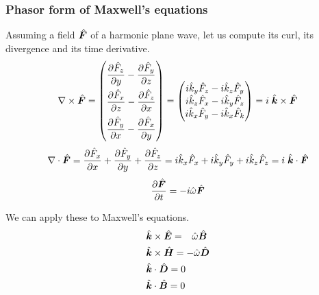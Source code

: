 \subsubsection{Phasor form of Maxwell's equations}
Assuming a field $\hat{\bm{F}}$ of a harmonic plane wave, let us compute its curl, its divergence and its time derivative.
\begin{equation}
    \setlength{\delimitershortfall}{0pt}
    \nabla \times \vectcp{F}
    =
    \begin{pmatrix}
        \dfrac{\partial \cp{F}_z}{\partial y} -
        \dfrac{\partial \cp{F}_y}{\partial z}
        \\[2ex]
        \dfrac{\partial \cp{F}_x}{\partial z} -
        \dfrac{\partial \cp{F}_z}{\partial x}
        \\[2ex]
        \dfrac{\partial \cp{F}_y}{\partial x} -
        \dfrac{\partial \cp{F}_x}{\partial y}
    \end{pmatrix}
    =
    \begin{pmatrix}
        i \cp{k}_y \cp{F}_z - i \cp{k}_z \cp{F}_y \\
        i \cp{k}_z \cp{F}_x - i \cp{k}_y \cp{F}_z \\
        i \cp{k}_x \cp{F}_y - i \cp{k}_x \cp{F}_k
    \end{pmatrix}
    =
    i \; \vectcp{k} \times \vectcp{F}
\end{equation}
\begin{equation}
    \nabla \cdot \hat{\bm{F}}
    =
    \frac{\partial \hat{F}_x}{\partial x} +
    \frac{\partial \hat{F}_y}{\partial y} +
    \frac{\partial \hat{F}_z}{\partial z}
    =
    i \hat{k}_x \hat{F}_x + i \hat{k}_y \hat{F}_y + i \hat{k}_z \hat{F}_z
    =
    i \; \hat{\bm{k}} \cdot \hat{\bm{F}}
\end{equation}
\begin{equation}
    \frac{\partial \hat{\bm{F}}}{\partial t}
    =
    -i \hat{\omega} \hat{\bm{F}}
\end{equation}

We can apply these to Maxwell's equations.
\begin{subequations}
    \begin{align}
        &\vectcp{k} \times \vectcp{E} = \hphantom{\mathrel{-}}\cp{\omega} \vectcp{B} \\
        &\vectcp{k} \times \vectcp{H} = -\cp{\omega} \vectcp{D} \\
        &\vectcp{k} \cdot  \vectcp{D} = 0 \\
        &\vectcp{k} \cdot  \vectcp{B} = 0
    \end{align}
\end{subequations}

